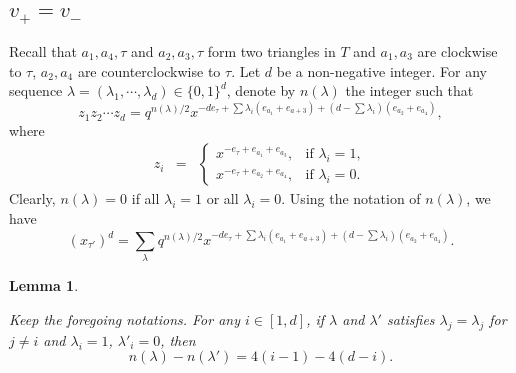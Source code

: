 \documentclass[10pt]{amsart}
\theoremstyle{theorems}
\newtheorem{Lemma}[Theorem]{Lemma}
\begin{document}
\medskip

\subsection{$v_{+}=v_{-}$}

Recall that $a_1,a_4,\tau$ and $a_2,a_3,\tau$ form two triangles in $T$ and $a_1,a_3$ are clockwise to $\tau$, $a_2,a_4$ are counterclockwise to $\tau$.  Let $d$ be a non-negative integer. For any sequence $\lambda=(\lambda_1,\cdots,\lambda_d)\in \{0,1\}^d$, denote by $n(\lambda)$ the integer such that $$z_1z_2\cdots z_d=q^{n(\lambda)/2}x^{-de_{\tau}+\sum\lambda_i(e_{a_1}+e_{a+3})+(d-\sum\lambda_i)(e_{a_2}+e_{a_4})},$$ where
  \[\begin{array}{ccl} z_i &=&

         \left\{\begin{array}{ll}

             x^{-e_{\tau}+e_{a_1}+e_{a_3}}, &\mbox{if $\lambda_i=1$}, \\

             x^{-e_{\tau}+e_{a_2}+e_{a_4}}, &\mbox{if $\lambda_i=0$}.

         \end{array}\right.

 \end{array}\]
Clearly, $n(\lambda)=0$ if all $\lambda_i=1$ or all $\lambda_i=0$. Using the notation of $n(\lambda)$, we have
$$(x_{\tau'})^d=\textstyle\sum_{\lambda}q^{n(\lambda)/2}x^{-de_{\tau}+\sum\lambda_i(e_{a_1}+e_{a+3})+(d-\sum\lambda_i)(e_{a_2}+e_{a_4})}.$$

\medskip

\begin{Lemma}\label{iterate}

Keep the foregoing notations. For any $i\in [1,d]$, if $\lambda$ and $\lambda'$ satisfies $\lambda_j=\lambda_j$ for $j\neq i$ and $\lambda_i=1$, $\lambda'_i=0$, then $$n(\lambda)-n(\lambda')=4(i-1)-4(d-i).$$

\end{Lemma}
\end{document}
